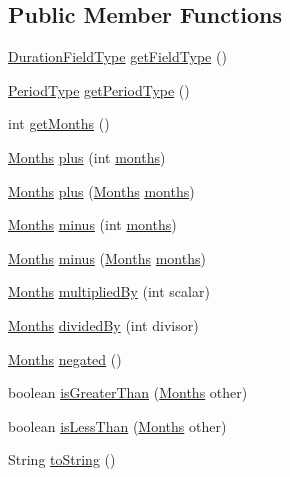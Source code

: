\subsection*{Public Member Functions}
\begin{DoxyCompactItemize}
\item 
\hyperlink{classorg_1_1joda_1_1time_1_1_duration_field_type}{Duration\-Field\-Type} \hyperlink{classorg_1_1joda_1_1time_1_1_months_aa2e27b3442f4a7343c2bd675b1ad39fc}{get\-Field\-Type} ()
\item 
\hyperlink{classorg_1_1joda_1_1time_1_1_period_type}{Period\-Type} \hyperlink{classorg_1_1joda_1_1time_1_1_months_a2983f3f2ded7e1bdea8b0bbbbc62675e}{get\-Period\-Type} ()
\item 
int \hyperlink{classorg_1_1joda_1_1time_1_1_months_a321357a66941a8dcc3a1d7b0b82304d6}{get\-Months} ()
\item 
\hyperlink{classorg_1_1joda_1_1time_1_1_months}{Months} \hyperlink{classorg_1_1joda_1_1time_1_1_months_a109386b3ae3c1597970f4a7af87fbacb}{plus} (int \hyperlink{classorg_1_1joda_1_1time_1_1_months_ab48e4eb193664a7bfdb722f0c2986652}{months})
\item 
\hyperlink{classorg_1_1joda_1_1time_1_1_months}{Months} \hyperlink{classorg_1_1joda_1_1time_1_1_months_a581a42bc649643b779685749861cb8b5}{plus} (\hyperlink{classorg_1_1joda_1_1time_1_1_months}{Months} \hyperlink{classorg_1_1joda_1_1time_1_1_months_ab48e4eb193664a7bfdb722f0c2986652}{months})
\item 
\hyperlink{classorg_1_1joda_1_1time_1_1_months}{Months} \hyperlink{classorg_1_1joda_1_1time_1_1_months_aaa44689627c65d8b27dd3d4d2d905d8a}{minus} (int \hyperlink{classorg_1_1joda_1_1time_1_1_months_ab48e4eb193664a7bfdb722f0c2986652}{months})
\item 
\hyperlink{classorg_1_1joda_1_1time_1_1_months}{Months} \hyperlink{classorg_1_1joda_1_1time_1_1_months_a515189c6216f4e21a435295826f491ad}{minus} (\hyperlink{classorg_1_1joda_1_1time_1_1_months}{Months} \hyperlink{classorg_1_1joda_1_1time_1_1_months_ab48e4eb193664a7bfdb722f0c2986652}{months})
\item 
\hyperlink{classorg_1_1joda_1_1time_1_1_months}{Months} \hyperlink{classorg_1_1joda_1_1time_1_1_months_a46e063e696e1d93ad9a9c9b96286a6b0}{multiplied\-By} (int scalar)
\item 
\hyperlink{classorg_1_1joda_1_1time_1_1_months}{Months} \hyperlink{classorg_1_1joda_1_1time_1_1_months_a3b179bc2626afc3fb1e0785042a1c45c}{divided\-By} (int divisor)
\item 
\hyperlink{classorg_1_1joda_1_1time_1_1_months}{Months} \hyperlink{classorg_1_1joda_1_1time_1_1_months_ab5773008b2159b201b80535598ac9296}{negated} ()
\item 
boolean \hyperlink{classorg_1_1joda_1_1time_1_1_months_ab2a6010901f45eb73231e62804873e43}{is\-Greater\-Than} (\hyperlink{classorg_1_1joda_1_1time_1_1_months}{Months} other)
\item 
boolean \hyperlink{classorg_1_1joda_1_1time_1_1_months_a838c4f1f451aca7c7782bcb3bd8fa013}{is\-Less\-Than} (\hyperlink{classorg_1_1joda_1_1time_1_1_months}{Months} other)
\item 
String \hyperlink{classorg_1_1joda_1_1time_1_1_months_a9bb2730768a361b934f30a4216d70b61}{to\-String} ()
\end{DoxyCompactItemize}
